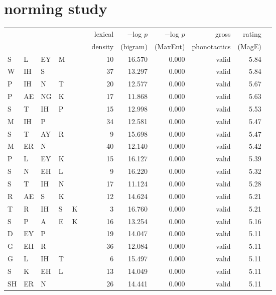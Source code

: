 \section{\citet{Albright2003b} norming study} 

\begin{longtable}{l@{ } l@{ } l@{ } l@{ } l@{ } l r r r r r r} 
\toprule
   &    &    &    &    &   & lexical & $-$log $p$ & $-$log $p$ & gross & rating \\
&&&&&& density & (bigram) & (MaxEnt) & phonotactics & (MagE) \\
\midrule
S  & L  & EY & M  &    &   & 10 & 16.570 & 0.000 & valid   & 5.84 \\
W  & IH & S  &    &    &   & 37 & 13.297 & 0.000 & valid   & 5.84 \\
P  & IH & N  & T  &    &   & 20 & 12.577 & 0.000 & valid   & 5.67 \\
P  & AE & NG & K  &    &   & 17 & 11.868 & 0.000 & valid   & 5.63 \\
S  & T  & IH & P  &    &   & 15 & 12.998 & 0.000 & valid   & 5.53 \\
M  & IH & P  &    &    &   & 34 & 12.581 & 0.000 & valid   & 5.47 \\
S  & T  & AY & R  &    &   &  9 & 15.698 & 0.000 & valid   & 5.47 \\
M  & ER & N  &    &    &   & 40 & 12.140 & 0.000 & valid   & 5.42 \\
P  & L  & EY & K  &    &   & 15 & 16.127 & 0.000 & valid   & 5.39 \\
S  & N  & EH & L  &    &   &  9 & 16.220 & 0.000 & valid   & 5.32 \\
S  & T  & IH & N  &    &   & 17 & 11.124 & 0.000 & valid   & 5.28 \\
R  & AE & S  & K  &    &   & 12 & 14.624 & 0.000 & valid   & 5.21 \\
T  & R  & IH & S  & K  &   &  3 & 16.760 & 0.000 & valid   & 5.21 \\
S  & P  & A  & E  & K  &   & 16 & 13.254 & 0.000 & valid   & 5.16 \\
D  & EY & P  &    &    &   & 19 & 14.047 & 0.000 & valid   & 5.11 \\
G  & EH & R  &    &    &   & 36 & 12.084 & 0.000 & valid   & 5.11 \\
G  & L  & IH & T  &    &   &  6 & 15.497 & 0.000 & valid   & 5.11 \\
S  & K  & EH & L  &    &   & 13 & 14.049 & 0.000 & valid   & 5.11 \\
SH & ER & N  &    &    &   & 26 & 14.441 & 0.000 & valid   & 5.11 \\

\end{longtable}
